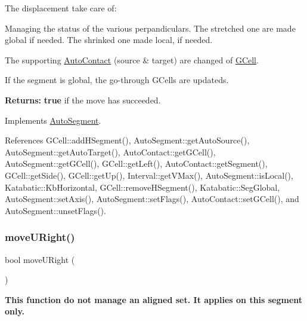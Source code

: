 The displacement take care of\+:
\begin{DoxyItemize}
\item Managing the status of the various perpandiculars. The stretched one are made global if needed. The shrinked one made local, if needed.
\item The supporting \hyperlink{classKatabatic_1_1AutoContact}{Auto\+Contact} (source \& target) are changed of \hyperlink{classKatabatic_1_1GCell}{G\+Cell}.
\item If the segment is global, the go-\/through G\+Cells are updateds.
\end{DoxyItemize}

{\bfseries Returns\+:} {\bfseries true} if the move has succeeded.

 

Implements \hyperlink{classKatabatic_1_1AutoSegment_af8ca7b17e952f4b599aeeb2f4e5be395}{Auto\+Segment}.



References G\+Cell\+::add\+H\+Segment(), Auto\+Segment\+::get\+Auto\+Source(), Auto\+Segment\+::get\+Auto\+Target(), Auto\+Contact\+::get\+G\+Cell(), Auto\+Segment\+::get\+G\+Cell(), G\+Cell\+::get\+Left(), Auto\+Contact\+::get\+Segment(), G\+Cell\+::get\+Side(), G\+Cell\+::get\+Up(), Interval\+::get\+V\+Max(), Auto\+Segment\+::is\+Local(), Katabatic\+::\+Kb\+Horizontal, G\+Cell\+::remove\+H\+Segment(), Katabatic\+::\+Seg\+Global, Auto\+Segment\+::set\+Axis(), Auto\+Segment\+::set\+Flags(), Auto\+Contact\+::set\+G\+Cell(), and Auto\+Segment\+::unset\+Flags().

\mbox{\label{classKatabatic_1_1AutoVertical_aa469e37853e31f8b1bc817518c896d62}} 
\subsubsection{\texorpdfstring{move\+U\+Right()}{moveURight()}}
{\footnotesize\ttfamily bool move\+U\+Right (\begin{DoxyParamCaption}{ }\end{DoxyParamCaption})\hspace{0.3cm}{\ttfamily [virtual]}}

{\bfseries This function do not manage an aligned set. It applies on {\ttfamily this} segment only.}

